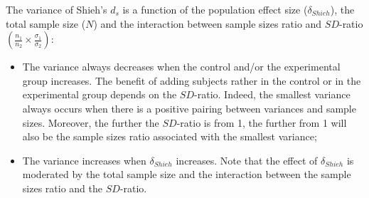 \documentclass[
  english,
  man]{apa6}
\begin{document}
The variance of Shieh's \(d_s\) is a function of the population effect size (\(\delta_{Shieh}\)), the total sample size (\(N\)) and the interaction between sample sizes ratio and \(SD\)-ratio \(\left(\frac{n_1}{n_2}\times\frac{\sigma_1}{\sigma_2} \right)\):

\begin{itemize}
\item
  The variance always decreases when the control and/or the experimental group increases. The benefit of adding subjects rather in the control or in the experimental group depends on the \(SD\)-ratio. Indeed, the smallest variance always occurs when there is a positive pairing between variances and sample sizes. Moreover, the further the \(SD\)-ratio is from 1, the further from 1 will also be the sample sizes ratio associated with the smallest variance;
\item
  The variance increases when \(\delta_{Shieh}\) increases. Note that the effect of \(\delta_{Shieh}\) is moderated by the total sample size and the interaction between the sample sizes ratio and the \(SD\)-ratio.
\end{itemize}
\end{document}

